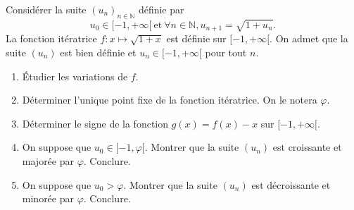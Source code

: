\documentclass[solutions]{exercices}
\begin{document}

\begin{exercice}[\di]
Considérer la suite $(u_n)_{n \in \mathbb{N}}$ définie par
$$u_0\in[-1,+\infty[\ \textrm{et} \ \forall n\in\mathbb{N}, u_{n+1}=\sqrt{1+u_n}.$$
La fonction itératrice $f:x\mapsto\sqrt{1+x}$ est définie sur $[-1,+\infty[$.
On admet que la suite $(u_n)$ est bien définie et $u_n\in[-1,+\infty[$ pour tout $n$.
\begin{enumerate}
 \item Étudier les variations de $f$.
 \item Déterminer l'unique point fixe de la fonction itératrice. On le notera $\varphi$.
 \item Déterminer le signe de la fonction $g(x)=f(x)-x$ sur $[-1,+\infty[$.
 \item On suppose que $u_0 \in [-1, \varphi[$. Montrer que la suite $(u_n)$ est croissante et majorée par $\varphi$. Conclure.
 \item On suppose que $u_0 > \varphi$. Montrer que la suite $(u_n)$ est décroissante et minorée par $\varphi$. Conclure.
\end{enumerate}
\end{exercice}
\end{document}
